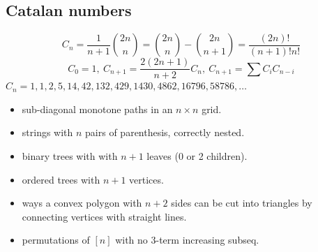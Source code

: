 	\subsection{Catalan numbers}
		\[ C_n=\frac{1}{n+1}\binom{2n}{n}= \binom{2n}{n}-\binom{2n}{n+1} = \frac{(2n)!}{(n+1)!n!} \]
		\[ C_0=1,\ C_{n+1} = \frac{2(2n+1)}{n+2}C_n,\ C_{n+1}=\sum C_iC_{n-i} \]
		${C_n = 1, 1, 2, 5, 14, 42, 132, 429, 1430, 4862, 16796, 58786, \dots}$
		\begin{itemize}
			\item sub-diagonal monotone paths in an $n\times n$ grid.
			\item strings with $n$ pairs of parenthesis, correctly nested.
			\item binary trees with with $n+1$ leaves (0 or 2 children).
			\item ordered trees with $n+1$ vertices.
			\item ways a convex polygon with $n+2$ sides can be cut into triangles by connecting vertices with straight lines.
			\item permutations of $[n]$ with no 3-term increasing subseq.
		\end{itemize}